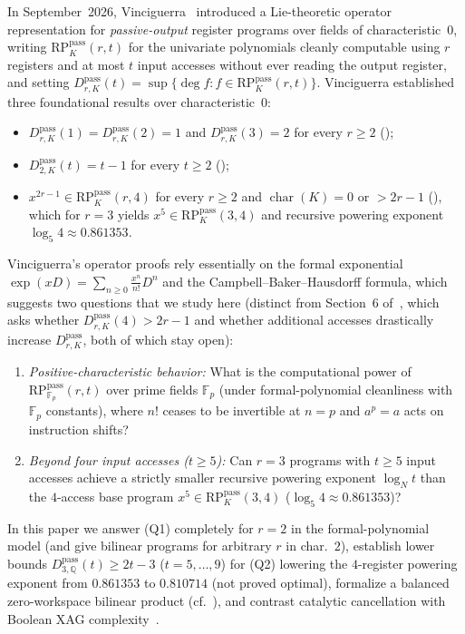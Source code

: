 \documentclass[11pt,reqno]{amsart}
\theoremstyle{definition}
\newcommand{\F}{\mathbb{F}}
\newcommand{\Q}{\mathbb{Q}}
\newcommand{\RP}{\mathrm{RP}}
\newcommand{\pass}{\mathrm{pass}}
\begin{document}
In September~2026, Vinciguerra~\cite{Vinciguerra2026} introduced a Lie-theoretic operator representation for \emph{passive-output} register programs over fields of characteristic~$0$, writing $\RP_K^{\pass}(r, t)$ for the univariate polynomials cleanly computable using $r$ registers and at most $t$ input accesses without ever reading the output register, and setting $D_{r,K}^{\pass}(t) = \sup\{\deg f : f \in \RP_K^{\pass}(r, t)\}$.
Vinciguerra established three foundational results over characteristic~$0$:
\begin{itemize}
  \item $D_{r,K}^{\pass}(1) = D_{r,K}^{\pass}(2) = 1$ and $D_{r,K}^{\pass}(3) = 2$ for every $r \ge 2$ (\cite[Theorems~3.2 and~3.3]{Vinciguerra2026});
  \item $D_{2,K}^{\pass}(t) = t - 1$ for every $t \ge 2$ (\cite[Theorem~3.5]{Vinciguerra2026});
  \item $x^{2r-1} \in \RP_K^{\pass}(r, 4)$ for every $r \ge 2$ and $\operatorname{char}(K) = 0$ or $> 2r-1$ (\cite[Theorem~2.3]{Vinciguerra2026}), which for $r = 3$ yields $x^5 \in \RP_K^{\pass}(3, 4)$ and recursive powering exponent $\log_5 4 \approx 0.861353$.
\end{itemize}

Vinciguerra's operator proofs rely essentially on the formal exponential $\exp(x D) = \sum_{n \ge 0} \frac{x^n}{n!} D^n$ and the Campbell--Baker--Hausdorff formula, which suggests two questions that we study here (distinct from Section~6 of~\cite{Vinciguerra2026}, which asks whether $D_{r,K}^{\pass}(4) > 2r - 1$ and whether additional accesses drastically increase $D_{r,K}^{\pass}$, both of which stay open):
\begin{enumerate}
  \item[(Q1)] \emph{Positive-characteristic behavior:} What is the computational power of $\RP_{\F_p}^{\pass}(r, t)$ over prime fields $\F_p$ (under formal-polynomial cleanliness with $\F_p$ constants), where $n!$ ceases to be invertible at $n = p$ and $a^p = a$ acts on instruction shifts?
  \item[(Q2)] \emph{Beyond four input accesses ($t \ge 5$):} Can $r = 3$ programs with $t \ge 5$ input accesses achieve a strictly smaller recursive powering exponent $\log_N t$ than the $4$-access base program $x^5 \in \RP_K^{\pass}(3, 4)$ ($\log_5 4 \approx 0.861353$)?
\end{enumerate}

In this paper we answer (Q1) completely for $r = 2$ in the formal-polynomial model (and give bilinear programs for arbitrary $r$ in char.~$2$), establish lower bounds $D_{3,\Q}^{\pass}(t) \ge 2t - 3$ ($t = 5, \dots, 9$) for (Q2) lowering the $4$-register powering exponent from $0.861353$ to $0.810714$ (not proved optimal), formalize a balanced zero-workspace bilinear product (cf.~\cite{BenOrCleve1992}), and contrast catalytic cancellation with Boolean XAG complexity~\cite{BoyarFind2018,Morse2026}.
\end{document}
